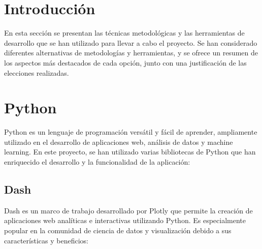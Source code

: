 
\section{Introducción}

En esta sección se presentan las técnicas metodológicas y las herramientas de desarrollo que se han utilizado para llevar a cabo el proyecto. Se han considerado diferentes alternativas de metodologías y herramientas, y se ofrece un resumen de los aspectos más destacados de cada opción, junto con una justificación de las elecciones realizadas.

\section{Python}

Python es un lenguaje de programación versátil y fácil de aprender, ampliamente utilizado en el desarrollo de aplicaciones web, análisis de datos y machine learning. En este proyecto, se han utilizado varias bibliotecas de Python que han enriquecido el desarrollo y la funcionalidad de la aplicación:

\subsection{Dash}

Dash \cite{dash} es un marco de trabajo desarrollado por Plotly que permite la creación de aplicaciones web analíticas e interactivas utilizando Python. Es especialmente popular en la comunidad de ciencia de datos y visualización debido a sus características y beneficios:
    
